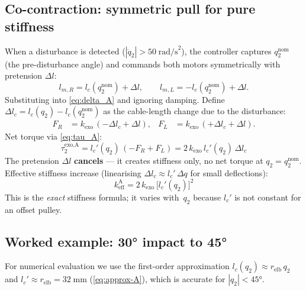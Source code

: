 \documentclass[11pt, a4paper]{article}
\begin{document}
\subsection{Co-contraction: symmetric pull for pure stiffness}

When a disturbance is detected ($|\ddot{q}_2| > 50\;\text{rad/s}^2$), the
controller captures $q_2^{\text{nom}}$ (the pre-disturbance angle) and
commands both motors symmetrically with pretension $\Delta l$:
%
\begin{equation}\label{eq:cmd_A}
    l_{m,R} = l_c(q_2^{\text{nom}}) + \Delta l, \qquad
    l_{m,L} = -l_c(q_2^{\text{nom}}) + \Delta l.
\end{equation}
%
Substituting into \eqref{eq:delta_A} and ignoring damping.  Define
$\Delta l_c = l_c(q_2) - l_c(q_2^{\text{nom}})$ as the cable-length change
due to the disturbance:
%
\begin{align}
    F_R &= k_{\text{exo}}\,(-\Delta l_c + \Delta l), &
    F_L &= k_{\text{exo}}\,(+\Delta l_c + \Delta l).
\end{align}
%
Net torque via \eqref{eq:tau_A}:
%
\begin{equation}\label{eq:tau_cocontract_A}
    \tau_2^{\text{exo,A}}
    = l_c'(q_2)\,(-F_R + F_L)
    = \boxed{2\,k_{\text{exo}}\,l_c'(q_2)\,\Delta l_c}
\end{equation}
%
The pretension $\Delta l$ \textbf{cancels} --- it creates stiffness only,
no net torque at $q_2 = q_2^{\text{nom}}$.  Effective stiffness increase
(linearising $\Delta l_c \approx l_c'\,\Delta q$ for small deflections):
%
\begin{equation}\label{eq:keff_A}
    k_{\text{eff}}^{\text{A}} = 2\,k_{\text{exo}}\,\bigl[l_c'(q_2)\bigr]^{2}
\end{equation}
%
This is the \emph{exact} stiffness formula; it varies with~$q_2$ because
$l_c'$ is not constant for an offset pulley.

\subsection{Worked example: 30° impact to 45°}
\label{sec:example-A}

\noindent
For numerical evaluation we use the first-order approximation
$l_c(q_2) \approx r_{\text{elb}}\,q_2$ and $l_c' \approx r_{\text{elb}}
= 32\;\text{mm}$ (\cref{eq:approx-A}), which is accurate for
$|q_2| < 45°$.
\end{document}
